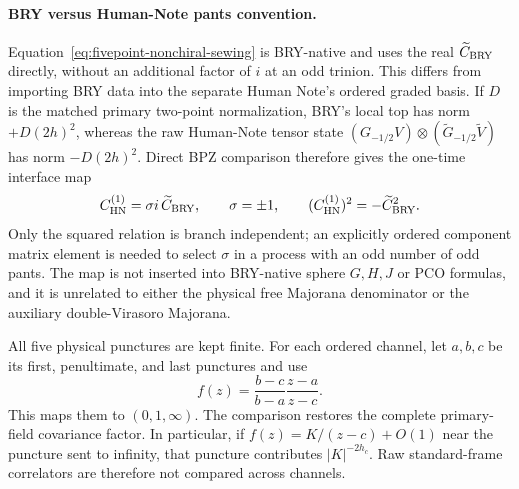 \documentclass[11pt]{article}
\begin{document}
\paragraph{BRY versus Human-Note pants convention.}
Equation~\eqref{eq:fivepoint-nonchiral-sewing} is BRY-native and uses the real
$\widetilde C_{\rm BRY}$ directly, without an additional factor of $i$ at an
odd trinion.  This differs from importing BRY data into the separate Human
Note's ordered graded basis.  If $D$ is the matched primary two-point
normalization, BRY's local top has norm $+D(2h)^2$, whereas the raw
Human-Note tensor state
$(G_{-1/2}V)\otimes(\widetilde G_{-1/2}\widetilde V)$ has norm
$-D(2h)^2$.  Direct BPZ comparison therefore gives the one-time interface
map
\begin{equation}
 C_{\rm HN}^{(1)}=\sigma i\,\widetilde C_{\rm BRY},
 \qquad \sigma=\pm1,
 \qquad
 (C_{\rm HN}^{(1)})^2=-\widetilde C_{\rm BRY}^{2}.
 \label{eq:bry-hn-odd-pants-interface}
\end{equation}
Only the squared relation is branch independent; an explicitly ordered
component matrix element is needed to select $\sigma$ in a process with an
odd number of odd pants.  The map is not inserted into BRY-native sphere
$G,H,J$ or PCO formulas, and it is unrelated to either the physical free
Majorana denominator or the auxiliary double-Virasoro Majorana.

All five physical punctures are kept finite.  For each ordered channel, let
\(a,b,c\) be its first, penultimate, and last punctures and use
\begin{equation}
 f(z)=\frac{b-c}{b-a}\frac{z-a}{z-c}.
 \label{eq:fivepoint-channel-mobius-map}
\end{equation}
This maps them to \((0,1,\infty)\).  The comparison restores the complete
primary-field covariance factor.  In particular, if
\(f(z)=K/(z-c)+O(1)\) near the puncture sent to infinity, that puncture
contributes \(|K|^{-2h_c}\).  Raw standard-frame correlators are therefore
not compared across channels.
\end{document}

